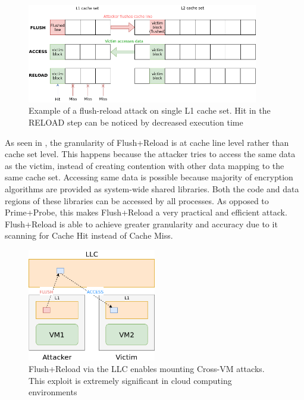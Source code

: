 \begin{figure}[h]
\includegraphics[width=0.9\textwidth]{figures/flush_reload}
\caption[Flush Reload attack]{Example of a flush-reload attack on single L1
    cache set. Hit in the RELOAD step can be noticed by decreased execution time}
\label{fig:fr}
\end{figure}

As seen in , the granularity of Flush+Reload is at cache line
level rather than cache set level. This happens because the attacker tries to
access the same data as the victim, instead of creating contention with other
data mapping to the same cache set. Accessing same data is possible because
majority of encryption algorithms are provided as system-wide shared
libraries. Both the code and data regions of these libraries can be accessed
by all processes. As opposed to Prime+Probe, this makes Flush+Reload a very
practical and efficient attack. Flush+Reload is able to achieve greater
granularity and accuracy due to it scanning for Cache Hit instead of Cache Miss.

\begin{figure}[h]
\centering
\includegraphics[width=0.5\textwidth]{figures/flush_reload_crossvm}
\caption[Cross-VM Flush+Reload]{Flush+Reload via the LLC enables mounting Cross-VM attacks. This exploit is extremely significant in cloud computing environments}
\label{fig:crossvm}
\end{figure}

